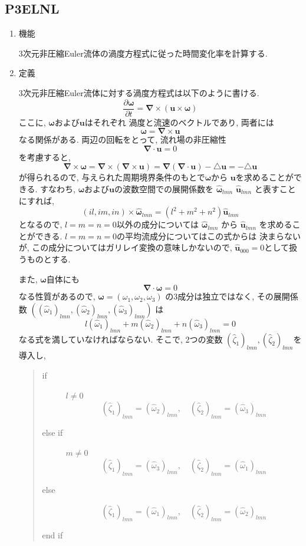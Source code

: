 \documentclass[a4j,fleqn]{jarticle}
\begin{document}

\subsection{P3ELNL}

\begin{enumerate}

\item 機能 

3次元非圧縮Euler流体の渦度方程式に従った時間変化率を計算する.

\item 定義

3次元非圧縮Euler流体に対する渦度方程式は以下のように書ける.
\[
\frac{\partial\boldsymbol{\omega}}{\partial t}=
\boldsymbol{\nabla}\times(\boldsymbol{u}\times\boldsymbol{\omega})
\]
ここに, $\boldsymbol{\omega}$および$\boldsymbol{u}$はそれぞれ
渦度と流速のベクトルであり, 両者には
\[
\boldsymbol{\omega}=\boldsymbol{\nabla}\times\boldsymbol{u}
\]
なる関係がある. 両辺の回転をとって, 流れ場の非圧縮性
\[
\boldsymbol{\nabla}\cdot\boldsymbol{u}=0
\]
を考慮すると, 
\[
\boldsymbol{\nabla}\times\boldsymbol{\omega}
=\boldsymbol{\nabla}\times(\boldsymbol{\nabla}\times\boldsymbol{u})
=\boldsymbol{\nabla}(\boldsymbol{\nabla}\cdot\boldsymbol{u})
 -\triangle\boldsymbol{u}
=-\triangle\boldsymbol{u}
\]
が得られるので, 与えられた周期境界条件のもとで$\boldsymbol{\omega}$から
$\boldsymbol{u}$を求めることができる.
すなわち,
$\boldsymbol{\omega}$および$\boldsymbol{u}$の波数空間での展開係数を
$\hat{\boldsymbol{\omega}}_{lmn}$
$\hat{\boldsymbol{u}}_{lmn}$
と表すことにすれば, 
\[
(il,im,in)\times\hat{\boldsymbol{\omega}}_{lmn}
=(l^2+m^2+n^2)\hat{\boldsymbol{u}}_{lmn}
\]
となるので, $l=m=n=0$以外の成分については
$\hat{\boldsymbol{\omega}}_{lmn}$
から
$\hat{\boldsymbol{u}}_{lmn}$
を求めることができる. $l=m=n=0$の平均流成分についてはこの式からは
決まらないが, この成分についてはガリレイ変換の意味しかないので,
$\hat{\boldsymbol{u}}_{000}=0$として扱うものとする.

また, $\boldsymbol{\omega}$自体にも
\[
\boldsymbol{\nabla}\cdot\boldsymbol{\omega}=0
\]
なる性質があるので, $\boldsymbol{\omega}=(\omega_1,\omega_2,\omega_3)$
の3成分は独立ではなく, その展開係数
$((\hat{\omega}_1)_{lmn},(\hat{\omega}_2)_{lmn},(\hat{\omega}_3)_{lmn})$
は
\[
l(\hat{\omega}_1)_{lmn}+m(\hat{\omega}_2)_{lmn}+n(\hat{\omega}_3)_{lmn}=0
\]
なる式を満していなければならない. そこで, 2つの変数
$(\hat{\zeta}_1)_{lmn},(\hat{\zeta}_2)_{lmn}$を導入し,
\begin{quote}
\begin{description}
\item[if] $l\neq 0$
\[
(\hat{\zeta}_1)_{lmn}=(\hat{\omega}_2)_{lmn},\quad
(\hat{\zeta}_2)_{lmn}=(\hat{\omega}_3)_{lmn}
\]
\item[else if] $m\neq 0$
\[
(\hat{\zeta}_1)_{lmn}=(\hat{\omega}_3)_{lmn},\quad
(\hat{\zeta}_2)_{lmn}=(\hat{\omega}_1)_{lmn}
\]
\item[else] 
\[
(\hat{\zeta}_1)_{lmn}=(\hat{\omega}_1)_{lmn},\quad
(\hat{\zeta}_2)_{lmn}=(\hat{\omega}_2)_{lmn}
\]
\item[end if]


\end{description}
\end{quote}
\end{enumerate}
\end{document}
